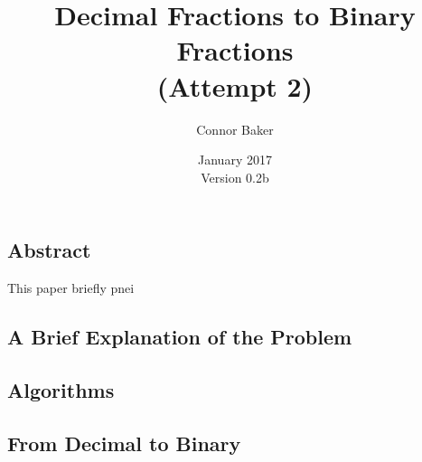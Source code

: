 \documentclass[12pt]{article}
\begin{document}
\null
\nointerlineskip
\vfill
\let \snewpage \newpage
\let \newpage \relax
    \title{Decimal Fractions to Binary Fractions\\(Attempt 2)}
    \author{Connor Baker}
    \date{January 2017\\Version 0.2b}
\maketitle
\let \newpage \snewpage
\vfill
\thispagestyle{empty}



\newpage %



\makeatletter
{}
\makeatother
\tableofcontents

\clearpage
{}

\begin{center}
\section{Abstract}
\end{center}
This paper briefly pnei



\newpage %



\begin{center}
\section{A Brief Explanation of the Problem}
\end{center}



\newpage %



\begin{center}
\section{Algorithms}
\end{center}

\subsection{From Decimal to Binary}
\end{document}
